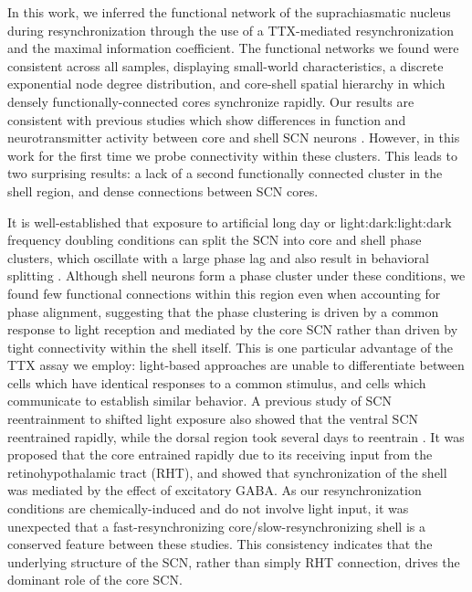 In this work, we inferred the functional network of the suprachiasmatic nucleus during resynchronization through the use of a TTX-mediated resynchronization and the maximal information coefficient.
The functional networks we found were consistent across all samples, displaying small-world characteristics, a discrete exponential node degree distribution, and core-shell spatial hierarchy in which densely functionally-connected cores synchronize rapidly.
Our results are consistent with previous studies which show differences in function and neurotransmitter activity between core and shell SCN neurons \cite{Albus2005, Yan2005, Evans2011, Evans2013, Watanabe2007, Welsh2010, Evans2015, Myung2015, DeWoskin2015}.
However, in this work for the first time we probe connectivity within these clusters.
This leads to two surprising results: a lack of a second functionally connected cluster in the shell region, and dense connections between SCN cores.

It is well-established that exposure to artificial long day or light:dark:light:dark frequency doubling conditions can split the SCN into core and shell phase clusters, which oscillate with a large phase lag and also result in behavioral splitting \cite{Watanabe2007,Evans2011,Evans2013}.
Although shell neurons form a phase cluster under these conditions, we found few functional connections within this region even when accounting for phase alignment, suggesting that the phase clustering is driven by a common response to light reception and mediated by the core SCN rather than driven by tight connectivity within the shell itself.
This is one particular advantage of the TTX assay we employ: light-based approaches are unable to differentiate between cells which have identical responses to a common stimulus, and cells which communicate to establish similar behavior.
A previous study of SCN reentrainment to shifted light exposure also showed that the ventral SCN reentrained rapidly, while the dorsal region took several days to reentrain \cite{Albus2005}.
It was proposed that the core entrained rapidly due to its receiving input from the retinohypothalamic tract (RHT), and showed that synchronization of the shell was mediated by the effect of excitatory GABA.
As our resynchronization conditions are chemically-induced and do not involve light input, it was unexpected that a fast-resynchronizing core/slow-resynchronizing shell is a conserved feature between these studies.
This consistency indicates that the underlying structure of the SCN, rather than simply RHT connection, drives the dominant role of the core SCN.

